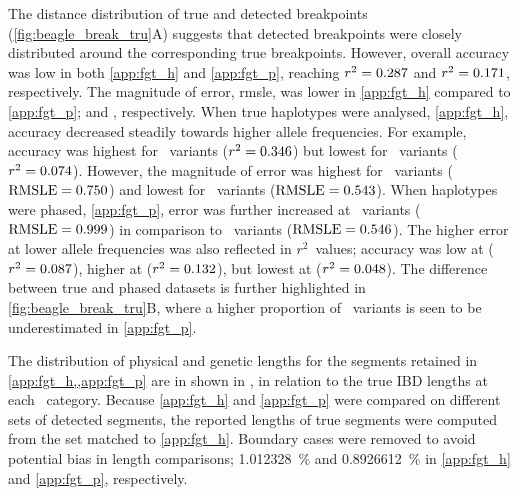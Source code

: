 The distance distribution of true and detected breakpoints (\cref{fig:beagle_break_tru}{A}) suggests that detected breakpoints were closely distributed around the corresponding true breakpoints.
However, overall accuracy was low in both \ref{app:fgt_h} and \ref{app:fgt_p}, reaching ${r^2 = \dec{0.2868218}}$ and ${r^2 = \dec{0.1707155}}$, respectively.
The magnitude of error, \gls{rmsle}, was lower in \ref{app:fgt_h} compared to \ref{app:fgt_p};  and , respectively.
When true haplotypes were analysed, \cref{app:fgt_h}, accuracy decreased steadily towards higher allele frequencies.
For example, accuracy was highest for ~variants (${r^2 = \dec{0.34591189}}$) but lowest for ~variants (${r^2 = \dec{0.07445725}}$).
However, the magnitude of error was highest for ~variants (${\rmsle = \dec{0.7498976}}$) and lowest for ~variants (${\rmsle = \dec{0.5433645}}$).
When haplotypes were phased, \cref{app:fgt_p}, error was further increased at ~variants (${\rmsle = \dec{0.999}}$) in comparison to ~variants (${\rmsle = \dec{0.5456303}}$).
The higher error at lower allele frequencies was also reflected in $r^2$~values; \eg accuracy was low at  (${r^2 = \dec{0.08720971}}$), higher at  (${r^2 = \dec{0.13222751}}$), but lowest at  (${r^2 = \dec{0.04827430}}$).
The difference between true and phased datasets is further highlighted in  \cref{fig:beagle_break_tru}{B}, where a higher proportion of ~variants is seen to be underestimated in \ref{app:fgt_p}.

%

%

The distribution of physical and genetic lengths for the segments retained in \cref{app:fgt_h,,app:fgt_p} are in shown in , in relation to the true IBD lengths at each \fk{}~category.
Because \ref{app:fgt_h} and \ref{app:fgt_p} were compared on different sets of detected segments, the reported lengths of true segments were computed from the set matched to \ref{app:fgt_h}.
Boundary cases were removed to avoid potential bias in length comparisons; \SI{1.012328}{\percent} and \SI{0.8926612}{\percent} in \ref{app:fgt_h} and \ref{app:fgt_p}, respectively.

